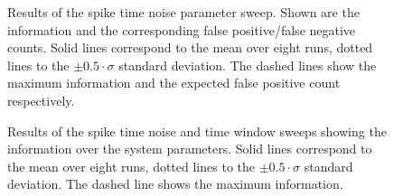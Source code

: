 \begin{figure}[t]
{	}
	\caption[Results of the spike time noise parameter sweep]{Results of the spike time noise parameter sweep. Shown are the information and the corresponding false positive/false negative counts. Solid lines correspond to the mean over eight runs, dotted lines to the $\pm0.5 \cdot \sigma$ standard deviation. The dashed lines show the maximum information and the expected false positive count respectively.}
	\label{fig:exp3_jitter}
\end{figure}

\begin{figure}[t]
	\centering
	\caption[Results of the synaptic weight noise and time window sweeps]{Results of the spike time noise and time window sweeps showing the information \info over the system parameters. Solid lines correspond to the mean over eight runs, dotted lines to the $\pm0.5 \cdot \sigma$ standard deviation. The dashed line shows the maximum information.}
\end{figure}

